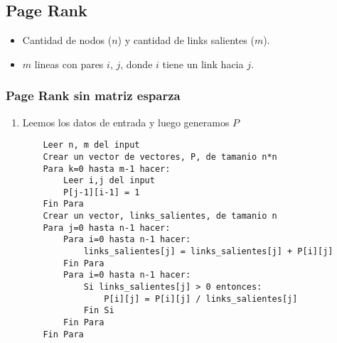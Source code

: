 \subsection{Page Rank}

\begin{itemize}
	\item Cantidad de nodos ($n$) y cantidad de links salientes ($m$).
	\item $m$ lineas con pares $i$, $j$, donde $i$ tiene un link hacia $j$.
\end{itemize}

\subsubsection{Page Rank sin matriz esparza}
\begin{enumerate}
	\item Leemos los datos de entrada y luego generamos $P$
	\begin{lstlisting}
	Leer n, m del input
	Crear un vector de vectores, P, de tamanio n*n
	Para k=0 hasta m-1 hacer:
		Leer i,j del input
		P[j-1][i-1] = 1
	Fin Para
	Crear un vector, links_salientes, de tamanio n
	Para j=0 hasta n-1 hacer:
		Para i=0 hasta n-1 hacer:
			links_salientes[j] = links_salientes[j] + P[i][j]
		Fin Para
		Para i=0 hasta n-1 hacer:
			Si links_salientes[j] > 0 entonces:
				P[i][j] = P[i][j] / links_salientes[j]
			Fin Si
		Fin Para
	Fin Para
	\end{lstlisting}
\end{enumerate}
